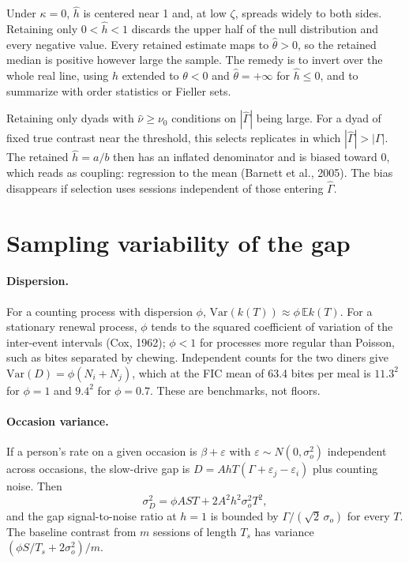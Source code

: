 \documentclass[12pt]{article}
\theoremstyle{definition}
\begin{document}
Under $\kappa=0$, $\hat h$ is centered near 1 and, at low $\zeta$, spreads widely to
both sides. Retaining only $0<\hat h<1$ discards the upper half of the null
distribution and every negative value. Every retained estimate maps to
$\hat\theta>0$, so the retained median is positive however large the sample. The
remedy is to invert over the whole real line, using $h$ extended to $\theta<0$ and
$\hat\theta=+\infty$ for $\hat h\le0$, and to summarize with order statistics or
Fieller sets.

Retaining only dyads with $\hat\nu\ge\nu_0$ conditions on $|\hat\Gamma|$ being large.
For a dyad of fixed true contrast near the threshold, this selects replicates in
which $|\hat\Gamma|>|\Gamma|$. The retained $\hat h=a/b$ then has an inflated
denominator and is biased toward 0, which reads as coupling: regression to the
mean (Barnett et al., 2005). The bias disappears if selection
uses sessions independent of those entering $\hat\Gamma$.

\section{Sampling variability of the gap}\label{sec:gap}

\paragraph{Dispersion.} For a counting process with dispersion $\phi$,
$\mathrm{Var}(k(T))\approx\phi\,\mathbb{E}k(T)$. For a stationary renewal process,
$\phi$ tends to the squared coefficient of variation of the inter-event intervals
(Cox, 1962); $\phi<1$ for processes more regular than Poisson, such as bites
separated by chewing. Independent counts for the two diners give
$\mathrm{Var}(D)=\phi(N_i+N_j)$, which at the FIC mean of 63.4 bites per meal is
$11.3^2$ for $\phi=1$ and $9.4^2$ for $\phi=0.7$. These are benchmarks, not floors.

\paragraph{Occasion variance.} If a person's rate on a given occasion is
$\beta+\varepsilon$ with $\varepsilon\sim N(0,\sigma_o^2)$ independent across
occasions, the slow-drive gap is $D=AhT(\Gamma+\varepsilon_j-\varepsilon_i)$ plus
counting noise. Then
\[
\sigma_D^2=\phi AST+2A^2h^2\sigma_o^2T^2 ,
\]
and the gap signal-to-noise ratio at $h=1$ is bounded by $\Gamma/(\sqrt2\,\sigma_o)$
for every $T$. The baseline contrast from $m$ sessions of length $T_s$ has
variance $(\phi S/T_s+2\sigma_o^2)/m$.
\end{document}
